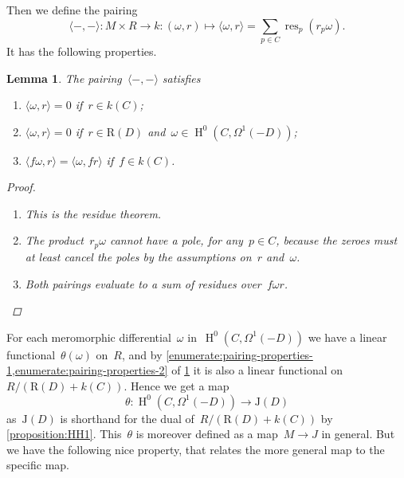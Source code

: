 \documentclass[10pt,a4paper]{article}
\theoremstyle{lecture}
\newtheorem{lemma}[theorem]{Lemma}
\DeclareMathOperator\HH{H}
\DeclareMathOperator\res{res}
\begin{document}
Then we define the pairing
\begin{equation}
  \langle-,-\rangle\colon M\times R\to k:(\omega,r)\mapsto\langle\omega,r\rangle=\sum_{p\in C}\res_p(r_p\omega).
\end{equation}
It has the following properties.
\begin{lemma}
  \label{lemma:pairing-properties}
  The pairing~$\langle-,-\rangle$ satisfies
  \begin{enumerate}
    \item\label{enumerate:pairing-properties-1} $\langle\omega,r\rangle=0$ if~$r\in k(C)$;
    \item\label{enumerate:pairing-properties-2} $\langle\omega,r\rangle=0$ if~$r\in \mathrm{R}(D)$ and~$\omega\in\HH^0(C,\Omega^1(-D))$;
    \item\label{enumerate:pairing-properties-3} $\langle f\omega,r\rangle=\langle\omega,fr\rangle$ if~$f\in k(C)$.
  \end{enumerate}

  \begin{proof}
    \begin{enumerate}
      \item This is the residue theorem.
      \item The product~$r_p\omega$ cannot have a pole, for any~$p\in C$, because the zeroes must at least cancel the poles by the assumptions on~$r$ and~$\omega$.
      \item Both pairings evaluate to a sum of residues over~$f\omega r$.
    \end{enumerate}
  \end{proof}
\end{lemma}
For each meromorphic differential~$\omega$ in~$\HH^0(C,\Omega^1(-D))$ we have a linear functional~$\theta(\omega)$ on~$R$, and by \cref{enumerate:pairing-properties-1,enumerate:pairing-properties-2} of \cref{lemma:pairing-properties} it is also a linear functional on~$R/(\mathrm{R}(D)+k(C))$. Hence we get a map
\begin{equation}
  \theta\colon\HH^0(C,\Omega^1(-D))\to\mathrm{J}(D)
\end{equation}
as~$\mathrm{J}(D)$ is shorthand for the dual of~$R/(\mathrm{R}(D)+k(C))$ by \cref{proposition:HH1}. This~$\theta$ is moreover defined as a map~$M\to J$ in general. But we have the following nice property, that relates the more general map to the specific map.
\end{document}
